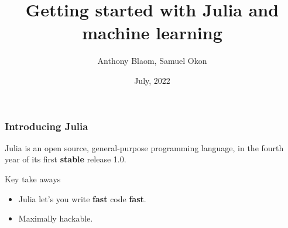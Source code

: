 \documentclass[t]{beamer}
\title{\color{Maroon} Getting started with Julia and machine learning}
\date{July, 2022}
\author{Anthony Blaom, Samuel Okon}
\newcommand\df{\bf\color{Maroon}}
\begin{document}



\begin{frame}
        \titlepage
\end{frame}

\iffalse

\begin{frame}
  \frametitle{Interacting}
  
  \begin{block}{Asking Anthony/Sam a question:}
    {\df\ttfamily https://pigeonhole.at/JULIA2}
  \end{block}

  \begin{block}{Participant forum:}
    Streamyard chat ({\em not} monitored by panelists)
  \end{block}

\end{frame}

\begin{frame}
  \frametitle{Outline}
  \begin{enumerate}
  \item Workshop resources
  \item Supervised Learning (mini lecture)
  \item Julia basics 
  \item Data frames 
  \item Supervised Learning using MLJ
  \end{enumerate}
\end{frame}

\fi

\begin{frame}
  \frametitle{Introducing Julia}
  Julia is an open source, general-purpose programming language, in
  the fourth year of its first {\df stable} release 1.0.\pause

  \begin{block}{Key take aways}
    \begin{itemize}
    \item Julia let's you write {\df fast}
      code {\df fast}.\pause
    \item Maximally hackable.
  \end{itemize}
  \end{block}
\end{frame}
\end{document}
